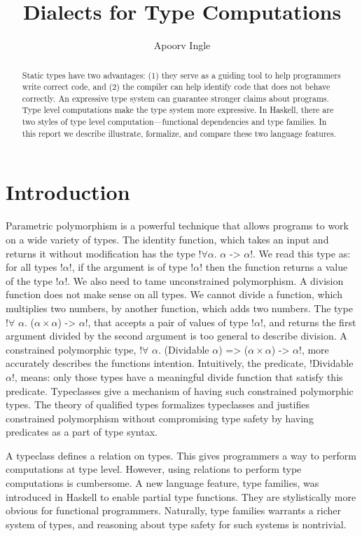 \documentclass[format=acmsmall,manuscript,screen,nonacm,margin=1in,11pt]{acmart}
\title{Dialects for Type Computations}
\author{Apoorv Ingle}
\affiliation{%
  \institution{University of Iowa}
  \department{Department of Computer Science}
  \streetaddress{McLean Hall}
  \city{Iowa City}
  \state{Iowa}
  \country{USA}}
\begin{document}
\begin{abstract}
  Static types have two advantages: (1) they serve as a guiding tool
  to help programmers write correct code, and (2) the compiler
  can help identify code that does not behave correctly.
  An expressive type system can guarantee stronger claims about programs.
  Type level computations make the type system more expressive.
  In Haskell, there are two styles of type level computation---functional dependencies
  and type families. In this report we describe illustrate,
  formalize, and compare these two language features.
\end{abstract}
\maketitle

\section{Introduction}
Parametric polymorphism is a powerful technique that allows programs to work on
a wide variety of types. The identity function, which takes an input and returns it
without modification has the type !$\forall$$\alpha$. $\alpha$ -> $\alpha$!.
We read this type as: for all types !$\alpha$!, if the argument is of type !$\alpha$!
then the function returns a value of the type !$\alpha$!.
We also need to tame unconstrained polymorphism.
A division function does not make sense on all types. We cannot
divide a function, which multiplies two numbers, by another function, which adds two numbers.
The type !$\forall$ $\alpha$. ($\alpha\times\alpha$) -> $\alpha$!, that accepts
a pair of values of type !$\alpha$!, and returns the first argument divided by the
second argument is too general to describe division. A constrained polymorphic type,
!$\forall$ $\alpha$. (Dividable $\alpha$) => ($\alpha\times\alpha$) -> $\alpha$!,
more accurately describes the functions intention. Intuitively, the predicate,
!Dividable $\alpha$!, means: only those types have a meaningful divide function
that satisfy this predicate. Typeclasses\cite{wadler_polymorphism_1989} give a mechanism
of having such constrained polymorphic types. The theory of qualified types\cite{jones_qualified_1994}
formalizes typeclasses and justifies constrained polymorphism
without compromising type safety by having predicates as a part of type syntax.

A typeclass defines a relation on types. This gives programmers a way to
perform computations at type level. However, using relations to perform type computations
is cumbersome. A new language feature, type families\cite{schrijvers_towards_2007}, was introduced in Haskell
to enable partial type functions. They are stylistically more obvious for functional programmers.
Naturally, type families warrants a richer system of types, and reasoning about type safety
for such systems is nontrivial.
\end{document}
